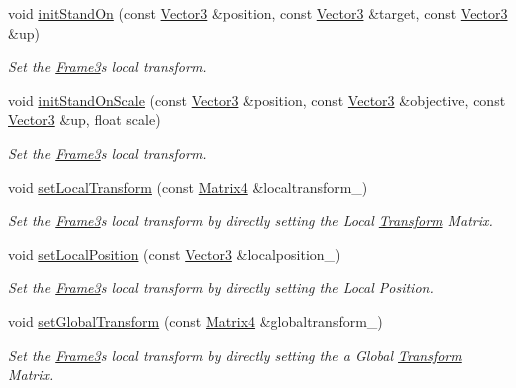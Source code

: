 \begin{DoxyCompactItemize}
void \hyperlink{class_i_dream_sky_1_1_frame3_a17b6bc5c746e4563e92f505755c5acd1}{init\+Stand\+On} (const \hyperlink{class_i_dream_sky_1_1_vector3}{Vector3} \&position, const \hyperlink{class_i_dream_sky_1_1_vector3}{Vector3} \&target, const \hyperlink{class_i_dream_sky_1_1_vector3}{Vector3} \&up)
\begin{DoxyCompactList}\small\item\em Set the \hyperlink{class_i_dream_sky_1_1_frame3}{Frame3}\textquotesingle{}s local transform. \end{DoxyCompactList}\item 
void \hyperlink{class_i_dream_sky_1_1_frame3_a0a6885f2b665329b4f6e5cc1b9abe28e}{init\+Stand\+On\+Scale} (const \hyperlink{class_i_dream_sky_1_1_vector3}{Vector3} \&position, const \hyperlink{class_i_dream_sky_1_1_vector3}{Vector3} \&objective, const \hyperlink{class_i_dream_sky_1_1_vector3}{Vector3} \&up, float scale)
\begin{DoxyCompactList}\small\item\em Set the \hyperlink{class_i_dream_sky_1_1_frame3}{Frame3}\textquotesingle{}s local transform. \end{DoxyCompactList}\item 
void \hyperlink{class_i_dream_sky_1_1_frame3_a83afcd522b770d9f91539a5edd120b71}{set\+Local\+Transform} (const \hyperlink{class_i_dream_sky_1_1_matrix4}{Matrix4} \&localtransform\+\_\+)
\begin{DoxyCompactList}\small\item\em Set the \hyperlink{class_i_dream_sky_1_1_frame3}{Frame3}\textquotesingle{}s local transform by directly setting the Local \hyperlink{class_i_dream_sky_1_1_transform}{Transform} Matrix. \end{DoxyCompactList}\item 
void \hyperlink{class_i_dream_sky_1_1_frame3_a4d7f2932c763df5cbb901264021113d1}{set\+Local\+Position} (const \hyperlink{class_i_dream_sky_1_1_vector3}{Vector3} \&localposition\+\_\+)
\begin{DoxyCompactList}\small\item\em Set the \hyperlink{class_i_dream_sky_1_1_frame3}{Frame3}\textquotesingle{}s local transform by directly setting the Local Position. \end{DoxyCompactList}\item 
void \hyperlink{class_i_dream_sky_1_1_frame3_a7e8615aa5b044ecc068c0ac2ecf1d764}{set\+Global\+Transform} (const \hyperlink{class_i_dream_sky_1_1_matrix4}{Matrix4} \&globaltransform\+\_\+)
\begin{DoxyCompactList}\small\item\em Set the \hyperlink{class_i_dream_sky_1_1_frame3}{Frame3}\textquotesingle{}s local transform by directly setting the a Global \hyperlink{class_i_dream_sky_1_1_transform}{Transform} Matrix. \end{DoxyCompactList}\item 

\end{DoxyCompactItemize}
